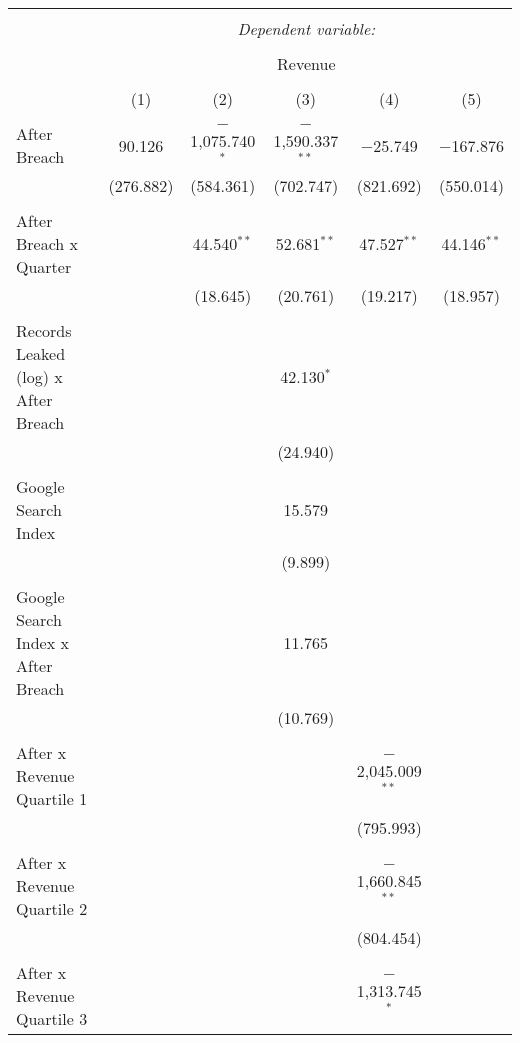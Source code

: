 
\begin{table}[!htbp] \centering 
  \caption{} 
  \label{} 
\begin{tabular}{@{\extracolsep{5pt}}lccccc} 
\\[-1.8ex]\hline 
\hline \\[-1.8ex] 
 & \multicolumn{5}{c}{\textit{Dependent variable:}} \\ 
\cline{2-6} 
\\[-1.8ex] & \multicolumn{5}{c}{Revenue} \\ 
\\[-1.8ex] & (1) & (2) & (3) & (4) & (5)\\ 
\hline \\[-1.8ex] 
 After Breach & 90.126 & $-$1,075.740$^{*}$ & $-$1,590.337$^{**}$ & $-$25.749 & $-$167.876 \\ 
  & (276.882) & (584.361) & (702.747) & (821.692) & (550.014) \\ 
  & & & & & \\ 
 After Breach x Quarter &  & 44.540$^{**}$ & 52.681$^{**}$ & 47.527$^{**}$ & 44.146$^{**}$ \\ 
  &  & (18.645) & (20.761) & (19.217) & (18.957) \\ 
  & & & & & \\ 
 Records Leaked (log) x After Breach &  &  & 42.130$^{*}$ &  &  \\ 
  &  &  & (24.940) &  &  \\ 
  & & & & & \\ 
 Google Search Index &  &  & 15.579 &  &  \\ 
  &  &  & (9.899) &  &  \\ 
  & & & & & \\ 
 Google Search Index x After Breach &  &  & 11.765 &  &  \\ 
  &  &  & (10.769) &  &  \\ 
  & & & & & \\ 
 After x Revenue Quartile 1 &  &  &  & $-$2,045.009$^{**}$ &  \\ 
  &  &  &  & (795.993) &  \\ 
  & & & & & \\ 
 After x Revenue Quartile 2 &  &  &  & $-$1,660.845$^{**}$ &  \\ 
  &  &  &  & (804.454) &  \\ 
  & & & & & \\ 
 After x Revenue Quartile 3 &  &  &  & $-$1,313.745$^{*}$ &  \\ 

\end{tabular}
\end{table}
